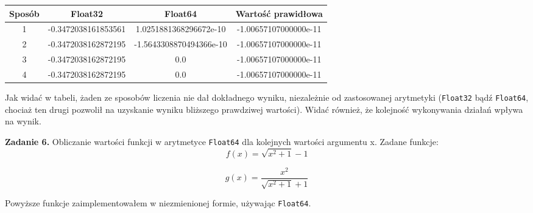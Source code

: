 \documentclass[15pt, a4paper]{article}
\begin{document}
\begin{table}[ht]
    \begin{adjustbox}{max width=\textwidth}
    \begin{tabular}{|c|c|c|c|}
        \hline 
        Sposób & Float32 & Float64 & Wartość prawidłowa \\ \hline
        1 & -0.3472038161853561  & 1.0251881368296672e-10 & -1.00657107000000e-11 \\ \hline
        2 & -0.3472038162872195 & -1.5643308870494366e-10 & -1.00657107000000e-11 \\ \hline
        3 & -0.3472038162872195 & 0.0 & -1.00657107000000e-11  \\ \hline
        4 & -0.3472038162872195 & 0.0 & -1.00657107000000e-11 \\ \hline
    \end{tabular}
    \end{adjustbox}
    \label{tab:products}
\end{table}

\vspace{0.5cm}

Jak widać w tabeli, żaden ze sposobów liczenia nie dał dokładnego wyniku, niezależnie od zastosowanej arytmetyki (\verb|Float32| bądź \verb|Float64|, chociaż ten drugi pozwolił na uzyskanie wyniku bliższego prawdziwej wartości). Widać również, że kolejność wykonywania działań wpływa na wynik.

\vspace{0.5cm}

\noindent\hrulefill


\vspace{0.5cm}

\noindent\textbf{Zadanie 6.} Obliczanie wartości funkcji w arytmetyce \verb|Float64| dla kolejnych wartości argumentu x. Zadane funkcje:
\[
f(x) = \sqrt{x^2 + 1} - 1
\]

\[
g(x) = \frac{x^2}{\sqrt{x^2 + 1} + 1}
\]

Powyższe funkcje zaimplementowałem w niezmienionej formie, używając \verb|Float64|.
\end{document}
